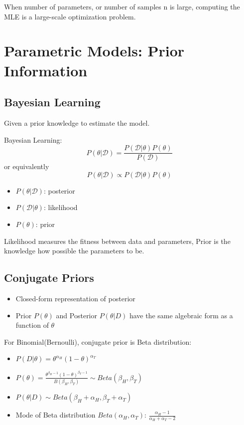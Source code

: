 \documentclass[letterpaper, 10pt, twocolumn]{article}
\begin{document}
When number of parameters, or number of samples n is large, computing the MLE is a large-scale optimization problem.

\newpage

\section{Parametric Models: Prior Information}

\subsection{Bayesian Learning}

Given a prior knowledge to estimate the model.

Bayesian Learning:
$$P(\theta|\mathcal{D}) = \frac{P(\mathcal{D}|\theta)P(\theta)}{P(\mathcal{D})}$$
or equivalently
$$P(\theta|\mathcal{D}) \propto P(\mathcal{D}|\theta)P(\theta)$$
\begin{itemize}
	\item $P(\theta|\mathcal{D})$: posterior
	\item $P(\mathcal{D}|\theta)$: likelihood
	\item $P(\theta)$: prior
\end{itemize}
Likelihood measures the fitness between data and parameters, Prior is the knowledge how possible the parameters to be.

\subsection{Conjugate Priors}

\begin{itemize}
	\item Closed-form representation of posterior
	\item Prior $P(\theta)$ and Posterior $P(\theta|D)$ have the same algebraic form as a function of $\theta$
\end{itemize}

For Binomial(Bernoulli), conjugate prior is Beta distribution:
\begin{itemize}
	\item $P(D|\theta) = \theta^{\alpha_H}(1-\theta)^{\alpha_T}$
	\item $P(\theta) = \frac{\theta^{\beta_H-1}(1-\theta)^{\beta_T-1}}{B(\beta_H,\beta_T)} \sim Beta(\beta_H,\beta_T)$
	\item $P(\theta|D) \sim Beta(\beta_H+\alpha_H,\beta_T+\alpha_T)$
	\item Mode of Beta distribution $Beta(\alpha_H,\alpha_T)$: $\frac{\alpha_H-1}{\alpha_H+\alpha_T-2}$
\end{itemize}
\end{document}
